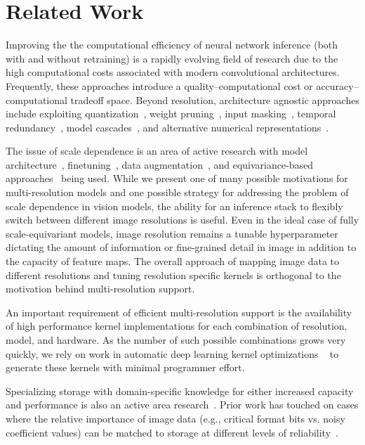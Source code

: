 \section{Related Work}
Improving the the computational efficiency of neural network inference (both with and without retraining) is a rapidly evolving field of research due to the high computational costs associated with modern convolutional architectures.
Frequently, these approaches introduce a quality--computational cost or accuracy--computational tradeoff space.
Beyond resolution, architecture agnostic approaches include exploiting quantization~\cite{rastegari2016xnor, zhou2016dorefa, fromm2020riptide}, weight pruning~\cite{ji2018tetris, frankle2018lottery}, input masking~\cite{yang2018energy}, temporal redundancy~\cite{buckler2018eva2}, model cascades~\cite{shen2017fast}, and alternative numerical representations~\cite{kim2016dynamic, lee2017energy, kalamkar2019study}.

The issue of scale dependence is an area of active research with model architecture~\cite{DBLP:journals/corr/KanazawaSJ14}, finetuning~\cite{touvron2019fixing}, data augmentation~\cite{hoffer2019mix}, and equivariance-based approaches~\cite{sosnovik2019scaleequivariant} being used.
While we present one of many possible motivations for multi-resolution models and one possible strategy for addressing the problem of scale dependence in vision models, the ability for an inference stack to flexibly switch between different image resolutions is useful.
Even in the ideal case of fully scale-equivariant models, image resolution remains a tunable hyperparameter dictating the amount of information or fine-grained detail in image in addition to the capacity of feature maps.
The overall approach of mapping image data to different resolutions and tuning resolution specific kernels is orthogonal to the motivation behind multi-resolution support.


An important requirement of efficient multi-resolution support is the availability of high performance kernel implementations for each combination of resolution, model, and hardware.
As the number of such possible combinations grows very quickly, we rely on work in automatic deep learning kernel optimizations ~\cite{ragan2013halide, chen2018tvm, zheng2020ansor, cowan2020automatic} to generate these kernels with minimal programmer effort.

Specializing storage with domain-specific knowledge for either increased capacity and performance is also an active area research~\cite{sampson2014approximate, jevdjic2017approximate, mazumdar2019vignette}.
Prior work has touched on cases where the relative importance of image data (e.g., critical format bits vs. noisy coefficient values) can be matched to storage at different levels of reliability~\cite{guo2016high, jevdjic2017approximate}.

